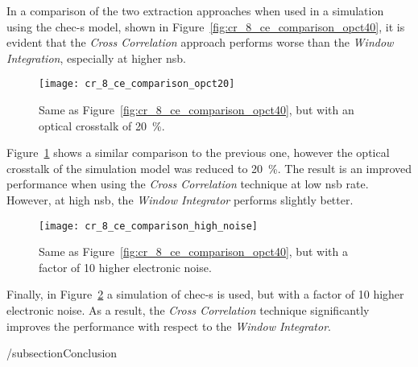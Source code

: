 In a comparison of the two extraction approaches when used in a simulation using the \gls{chec-s} model, shown in Figure~\ref{fig:cr_8_ce_comparison_opct40}, it is evident that the \textit{Cross Correlation} approach performs worse than the \textit{Window Integration}, especially at higher \gls{nsb}.

\begin{figure}
  \texttt{[image: cr\_8\_ce\_comparison\_opct20]}
  \caption[\textit{Charge Resolution} comparison between \textit{Cross Correlation} and \textit{Window Integration} for \textit{MCLab} data with an optical crosstalk of \SI{20}{\percent}.]{Same as Figure~\ref{fig:cr_8_ce_comparison_opct40}, but with an optical crosstalk of \SI{20}{\percent}.}
  \label{fig:cr_8_ce_comparison_opct20}
\end{figure}

Figure~\ref{fig:cr_8_ce_comparison_opct20} shows a similar comparison to the previous one, however the optical crosstalk of the simulation model was reduced to \SI{20}{\percent}. The result is an improved performance when using the \textit{Cross Correlation} technique at low \gls{nsb} rate. However, at high \gls{nsb}, the \textit{Window Integrator} performs slightly better.

\begin{figure}
  \texttt{[image: cr\_8\_ce\_comparison\_high\_noise]}
  \caption[\textit{Charge Resolution} comparison between \textit{Cross Correlation} and \textit{Window Integration} for \textit{MCLab} data with a high amount of electronic noise.]{Same as Figure~\ref{fig:cr_8_ce_comparison_opct40}, but with a factor of 10 higher electronic noise.}
  \label{fig:cr_8_ce_comparison_high_noise}
\end{figure}

Finally, in Figure~\ref{fig:cr_8_ce_comparison_high_noise} a simulation of \gls{chec-s} is used, but with a factor of 10 higher electronic noise. As a result, the \textit{Cross Correlation} technique significantly improves the performance with respect to the \textit{Window Integrator}.

/subsection{Conclusion}

